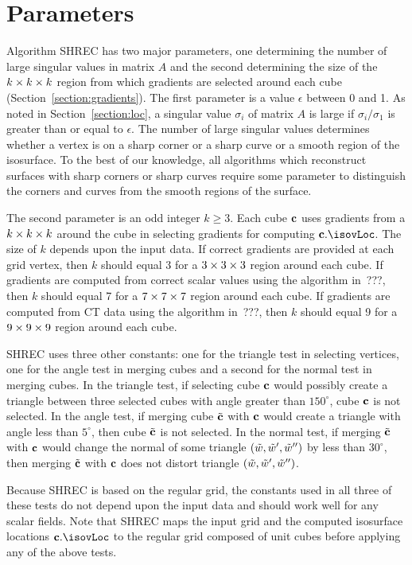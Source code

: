 \section{Parameters}
\label{section:parameters}

Algorithm SHREC has two major parameters,
one determining the number of large singular values in matrix $A$
and the second determining the size of the $k \times k \times k$ region 
from which gradients are selected around each cube
(Section~\ref{section:gradients}).
The first parameter is a value $\epsilon$ between 0 and 1.
As noted in Section~\ref{section:loc},
a singular value $\sigma_i$ of matrix $A$ 
is large if $\sigma_i/\sigma_1$ is greater than or equal to $\epsilon$.
The number of large singular values determines whether a vertex
is on a sharp corner or a sharp curve or a smooth region of the isosurface.
To the best of our knowledge, all algorithms which reconstruct surfaces 
with sharp corners or sharp curves require some parameter
to distinguish the corners and curves from the smooth regions of the surface.

The second parameter is an odd integer $k \ge 3$.
Each cube $\mathbf{c}$ uses gradients from a $k \times k \times k$ around the cube
in selecting gradients for computing $\cb.\isovLoc$.
The size of $k$ depends upon the input data.
If correct gradients are provided at each grid vertex,
then $k$ should equal 3 for a $3 \times 3 \times 3$ region around each cube.
If gradients are computed from correct scalar values 
using the algorithm in~???,
then $k$ should equal 7 for a $7 \times 7 \times 7$ region around each cube.
If gradients are computed from CT data 
using the algorithm in~???,
then $k$ should equal 9 for a $9 \times 9 \times 9$ region around each cube.

SHREC uses three other constants:
one for the triangle test in selecting vertices,
one for the angle test in merging cubes
and a second for the normal test in merging cubes.
In the triangle test,
if selecting cube $\mathbf{c}$ would possibly create a triangle between three
selected cubes with angle greater than $150^\circ$, 
cube $\mathbf{c}$ is not selected.
In the angle test,
if merging cube ${\tilde{\mathbf{c}}}$ with $\mathbf{c}$ would create a triangle with angle
less than $5^\circ$, then cube ${\tilde{\mathbf{c}}}$ is not selected.
In the normal test,
if merging ${\tilde{\mathbf{c}}}$ with $\mathbf{c}$ would change the normal 
of some triangle $(\tilde{w},\tilde{w}',\tilde{w}'')$ by less than $30^\circ$,
then merging ${\tilde{\mathbf{c}}}$ with $\mathbf{c}$ does not distort triangle $(\tilde{w},\tilde{w}',\tilde{w}'')$.

Because SHREC is based on the regular grid,
the constants used in all three of these tests do not depend 
upon the input data and should work well for any scalar fields.
Note that SHREC maps the input grid 
and the computed isosurface locations $\cb.\isovLoc$
to the regular grid composed of unit cubes
before applying any of the above tests.
